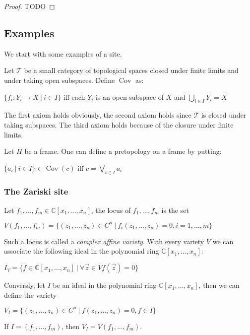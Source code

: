 \documentclass[a4paper]{article}
\theoremstyle{defin}
\theoremstyle{theorem}
\theoremstyle{claim}
\theoremstyle{prop}
\theoremstyle{lemma}
\theoremstyle{fact}
\theoremstyle{ex}
\theoremstyle{col}
\begin{document}
\begin{proof}
TODO
\end{proof}

\subsection{Examples}

We start with some examples of a site.

Let $\mathcal{T}$ be a small category of topological spaces closed under finite limits and under taking open subspaces. Define $\operatorname{Cov}$ as:
\begin{center}
$\{ f_i : Y_i \to X \: | \: i \in I \}$ iff each $Y_i$ is an open subspace of $X$ and $\bigcup \limits_{i \in I} Y_i = X$
\end{center}

The first axiom holds obviously, the second axiom holds since $\mathcal{T}$ is closed under taking subspaces. The third axiom holds because of the closure under finite limits.

Let $H$ be a frame. One can define a pretopology on a frame by putting:
\begin{center}
$\{ a_i \: | \: i \in I \} \in \operatorname{Cov}(c)$ iff $c = \bigvee \limits_{i \in I} a_i$
\end{center}

\subsubsection{The Zariski site}

Let $f_1, \dots, f_m \in \mathbb{C}[x_1, \dots, x_n]$, the locus of $f_1, \dots, f_m$ is the set
\begin{center}
$V(f_1, \dots, f_m) = \{ (z_1, \dots, z_n) \in C^n \: | \: f_i(z_1, \dots, z_n) = 0, i = 1, \dots, m \}$
\end{center}
Such a locus is called a \emph{complex affine variety}. With every variety $V$ we can associate the following ideal in the polynomial ring $\mathbb{C}[x_1, \dots, x_n]$:
\begin{center}
$I_V = \{ f \in \mathbb{C}[x_1, \dots, x_n] \: | \: \forall \vec{z} \in V f(\vec{z}) = 0 \}$
\end{center}
Conversly, let $I$ be an ideal in the polynomial ring $\mathbb{C}[x_1, \dots, x_n]$, then we can define the variety
\begin{center}
$V_I = \{ (z_1, \dots, z_n) \in C^n \: | \: f(z_1, \dots, z_n) = 0, f \in I \} $
\end{center}
If $I = (f_1, \dots, f_m)$, then $V_I = V(f_1, \dots, f_m)$.
\end{document}
